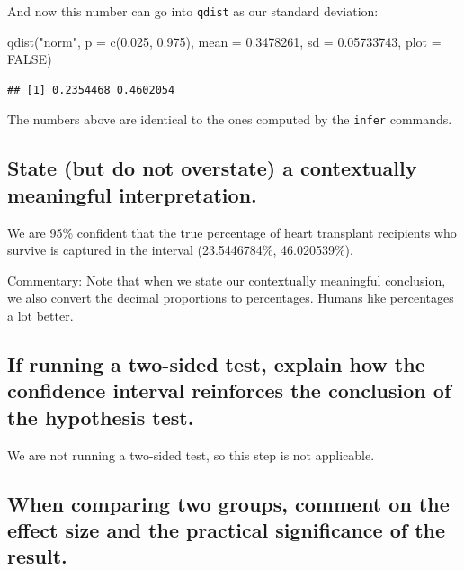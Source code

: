 \documentclass[
]{book}
\newenvironment{Shaded}{\begin{snugshade}}{\end{snugshade}}
\newcommand{\AttributeTok}[1]{\textcolor[rgb]{0.77,0.63,0.00}{#1}}
\newcommand{\ConstantTok}[1]{\textcolor[rgb]{0.00,0.00,0.00}{#1}}
\newcommand{\FloatTok}[1]{\textcolor[rgb]{0.00,0.00,0.81}{#1}}
\newcommand{\FunctionTok}[1]{\textcolor[rgb]{0.00,0.00,0.00}{#1}}
\newcommand{\NormalTok}[1]{#1}
\newcommand{\StringTok}[1]{\textcolor[rgb]{0.31,0.60,0.02}{#1}}
\begin{document}
And now this number can go into \texttt{qdist} as our standard deviation:

\begin{Shaded}
\begin{Highlighting}[]
\FunctionTok{qdist}\NormalTok{(}\StringTok{"norm"}\NormalTok{, }\AttributeTok{p =} \FunctionTok{c}\NormalTok{(}\FloatTok{0.025}\NormalTok{, }\FloatTok{0.975}\NormalTok{), }\AttributeTok{mean =} \FloatTok{0.3478261}\NormalTok{, }\AttributeTok{sd =} \FloatTok{0.05733743}\NormalTok{, }\AttributeTok{plot =} \ConstantTok{FALSE}\NormalTok{)}
\end{Highlighting}
\end{Shaded}

\begin{verbatim}
## [1] 0.2354468 0.4602054
\end{verbatim}

The numbers above are identical to the ones computed by the \texttt{infer} commands.

\hypertarget{one-prop-ex-ci-interpret}{%
\subsection{State (but do not overstate) a contextually meaningful interpretation.}\label{one-prop-ex-ci-interpret}}

We are 95\% confident that the true percentage of heart transplant recipients who survive is captured in the interval (23.5446784\%, 46.020539\%).

Commentary: Note that when we state our contextually meaningful conclusion, we also convert the decimal proportions to percentages. Humans like percentages a lot better.

\hypertarget{one-prop-ex-two-sided}{%
\subsection{If running a two-sided test, explain how the confidence interval reinforces the conclusion of the hypothesis test.}\label{one-prop-ex-two-sided}}

We are not running a two-sided test, so this step is not applicable.

\hypertarget{one-prop-ex-effect}{%
\subsection{When comparing two groups, comment on the effect size and the practical significance of the result.}\label{one-prop-ex-effect}}
\end{document}
